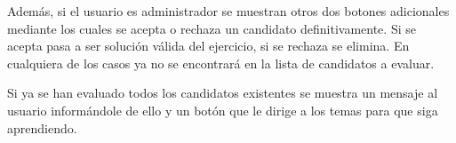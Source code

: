 Además, si el usuario es administrador se muestran otros dos botones adicionales mediante los cuales se acepta o rechaza un candidato definitivamente. Si se acepta pasa a ser solución válida del ejercicio, si se rechaza se elimina. En cualquiera de los casos ya no se encontrará en la lista de candidatos a evaluar.

\begin{figure}[H]
\begin{center}
\end{center}
\end{figure}

Si ya se han evaluado todos los candidatos existentes se muestra un mensaje al usuario informándole de ello y un botón que le dirige a los temas para que siga aprendiendo.

\begin{figure}[H]
\begin{center}
\end{center}
\end{figure}